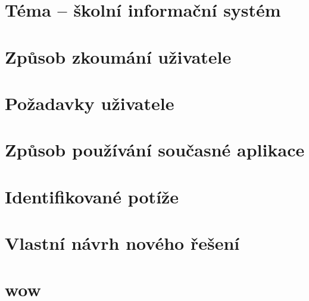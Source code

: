 \documentclass[a4paper, 11pt, twocolumn]{article}
\begin{document}
	\section*{Téma -- školní informační systém}
	
	
	\section*{Způsob zkoumání uživatele}

	\section*{Požadavky uživatele}

	\section*{Způsob používání současné aplikace}

	\section*{Identifikované potíže}

	\section*{Vlastní návrh nového řešení}


	\newpage



	
	\section*{wow}	
\end{document}
